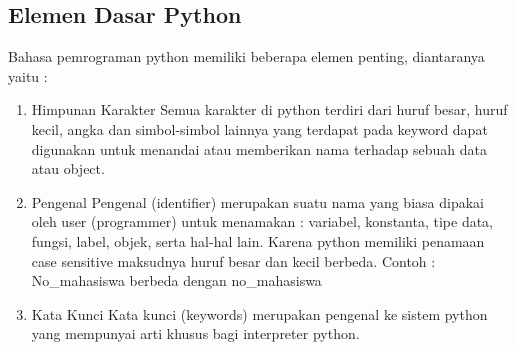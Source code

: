 \subsection{Elemen Dasar Python}
Bahasa pemrograman python memiliki beberapa elemen penting, diantaranya yaitu :
\begin{enumerate}
\item Himpunan Karakter
		Semua karakter di python terdiri dari huruf besar, huruf kecil, angka dan simbol-simbol lainnya yang terdapat pada keyword dapat digunakan untuk menandai atau memberikan nama terhadap sebuah data atau object.
\item Pengenal 
		Pengenal (identifier) merupakan suatu nama yang biasa dipakai oleh user (programmer) untuk menamakan : variabel, konstanta, tipe data, fungsi, label, objek, serta hal-hal lain. Karena python memiliki penamaan case sensitive maksudnya huruf besar dan kecil berbeda.	
		Contoh : No_mahasiswa berbeda dengan no_mahasiswa
\item Kata Kunci
		Kata kunci (keywords) merupakan pengenal ke sistem python yang mempunyai arti khusus bagi interpreter python. 
\end{enumerate}
